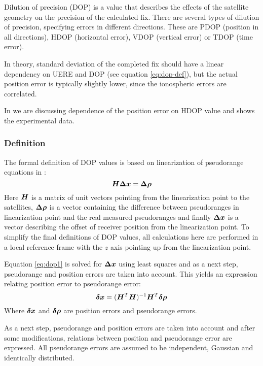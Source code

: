 Dilution of precision (DOP) is a value that describes the effects of the satellite geometry
on the precision of the calculated fix.
There are several types of dilution of precision, specifying errors in different directions.
These are PDOP (position in all directions), HDOP (horizontal error), VDOP (vertical error)
or TDOP (time error).

In theory, standard deviation of the completed fix should have a linear dependency on
UERE and DOP (see equation \eqref{eq:dop-def}), but the actual position error is typically slightly lower,
since the ionospheric errors are correlated.

In  we are discussing dependence of the position error on HDOP value
and  shows the experimental data.

\subsubsection{Definition}
The formal definition of DOP values is based on linearization of pseudorange equations
in :
\begin{equation}
	\label{eq:dop1}
	\bm{H}\bm{\Delta{}x} = \bm{\Delta{}\rho}
\end{equation}
Here \(\bm{H}\) is a matrix of unit vectors pointing from the linearization point
to the satellites, \(\bm{\Delta{}\rho}\) is a vector containing the difference between
pseudoranges in linearization point and the real measured pseudoranges and finally
\(\bm{\Delta{}x}\) is a vector describing the offset of receiver position from the
linearization point.
To simplify the final definitions of DOP values, all calculations here are performed
in a local reference frame with the \(z\) axis pointing up from the linearization point.

Equation \eqref{eq:dop1} is solved for \(\bm{\Delta{}x}\) using least squares and
as a next step, pseudorange and position errors are taken into account.
This yields an expression relating position error to pseudorange error:
\begin{equation}
	\bm{\delta{}x} = (\bm{H}^T \bm{H})^{-1} \bm{H}^T \bm{\delta{}\rho}
\end{equation}
Where \(\bm{\delta{}x}\) and \(\bm{\delta{}\rho}\) are position errors and pseudorange errors.

As a next step, pseudorange and position errors are taken into account and after
some modifications, relations between position and pseudorange error are expressed.
All pseudorange errors are assumed to be independent, Gaussian and identically distributed.


